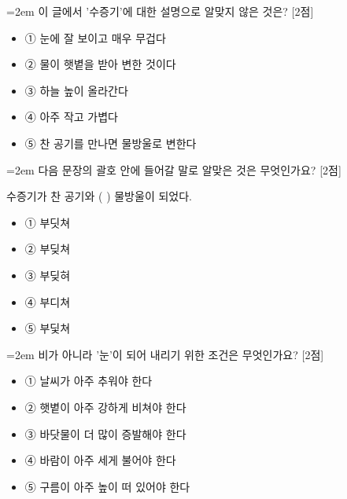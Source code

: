 \documentclass[12pt,a4paper]{article}
\newcommand{\qnum}[1]{%
  \tikz[baseline=(num.base)]{%
    \node[circle, fill=numCircle, text=white, inner sep=0pt,
          minimum size=18pt, font=\small\bfseries] (num) {#1};%
  }%
}
\newcommand{\pts}[1]{%
  \hfill\textcolor{ptsBadge}{[#1점]}%
}
\begin{document}
\vspace{4mm}
\begin{samepage}
{\hangindent=2em
\qnum{42}\enspace 이 글에서 '수증기'에 대한 설명으로 알맞지 않은 것은? \pts{2}
\par}

\vspace{3mm}
\begin{itemize}[leftmargin=2.5em, labelsep=0.3em, label={}, itemsep=4pt, parsep=1pt, topsep=0pt]
  \item ① 눈에 잘 보이고 매우 무겁다
  \item ② 물이 햇볕을 받아 변한 것이다
  \item ③ 하늘 높이 올라간다
  \item ④ 아주 작고 가볍다
  \item ⑤ 찬 공기를 만나면 물방울로 변한다
\end{itemize}
\end{samepage}

\vspace{4mm}
\begin{samepage}
{\hangindent=2em
\qnum{43}\enspace 다음 문장의 괄호 안에 들어갈 말로 알맞은 것은 무엇인가요? \pts{2}
\par}

\vspace{3mm}
\begin{tcolorbox}[bogi]
수증기가 찬 공기와 (          ) 물방울이 되었다.
\end{tcolorbox}
\vspace{3mm}
\begin{itemize}[leftmargin=2.5em, labelsep=0.3em, label={}, itemsep=4pt, parsep=1pt, topsep=0pt]
  \item ① 부딧쳐
  \item ② 부딪쳐
  \item ③ 부딪혀
  \item ④ 부디쳐
  \item ⑤ 부딫쳐
\end{itemize}
\end{samepage}

\vspace{4mm}
\begin{samepage}
{\hangindent=2em
\qnum{44}\enspace 비가 아니라 '눈'이 되어 내리기 위한 조건은 무엇인가요? \pts{2}
\par}

\vspace{3mm}
\begin{itemize}[leftmargin=2.5em, labelsep=0.3em, label={}, itemsep=4pt, parsep=1pt, topsep=0pt]
  \item ① 날씨가 아주 추워야 한다
  \item ② 햇볕이 아주 강하게 비쳐야 한다
  \item ③ 바닷물이 더 많이 증발해야 한다
  \item ④ 바람이 아주 세게 불어야 한다
  \item ⑤ 구름이 아주 높이 떠 있어야 한다
\end{itemize}
\end{samepage}
\end{document}
